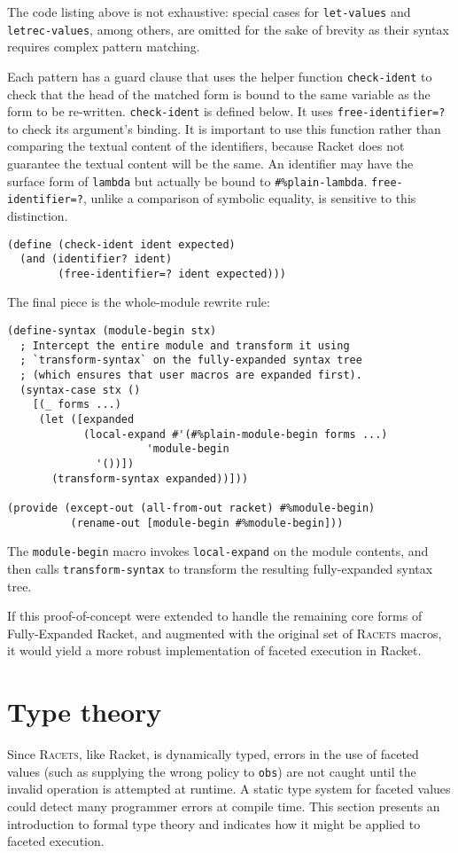 \documentclass{article}
\begin{document}
The code listing above is not exhaustive: special cases for \texttt{let-values} and \texttt{letrec-values}, among others, are omitted for the sake of brevity as their syntax requires complex pattern matching.

Each pattern has a guard clause that uses the helper function \texttt{check-ident} to check that the head of the matched form is bound to the same variable as the form to be re-written. \texttt{check-ident} is defined below. It uses \texttt{free-identifier=?} to check its argument's binding. It is important to use this function rather than comparing the textual content of the identifiers, because Racket does not guarantee the textual content will be the same. An identifier may have the surface form of \texttt{lambda} but actually be bound to \texttt{\#\%plain-lambda}. \texttt{free-identifier=?}, unlike a comparison of symbolic equality, is sensitive to this distinction.

\begin{lstlisting}
(define (check-ident ident expected)
  (and (identifier? ident)
        (free-identifier=? ident expected)))
\end{lstlisting}

The final piece is the whole-module rewrite rule:

\begin{lstlisting}
(define-syntax (module-begin stx)
  ; Intercept the entire module and transform it using
  ; `transform-syntax` on the fully-expanded syntax tree
  ; (which ensures that user macros are expanded first).
  (syntax-case stx ()
    [(_ forms ...)
     (let ([expanded
            (local-expand #'(#%plain-module-begin forms ...)
	                  'module-begin
			  '())])
       (transform-syntax expanded))]))

(provide (except-out (all-from-out racket) #%module-begin)
          (rename-out [module-begin #%module-begin]))
\end{lstlisting}

The \texttt{module-begin} macro invokes \texttt{local-expand} on the module contents, and then calls \texttt{transform-syntax} to transform the resulting fully-expanded syntax tree.

If this proof-of-concept were extended to handle the remaining core forms of Fully-Expanded Racket, and augmented with the original set of \textsc{Racets} macros, it would yield a more robust implementation of faceted execution in Racket.



\section{Type theory\label{sec:types}}
Since \textsc{Racets}, like Racket, is dynamically typed, errors in the use of faceted values (such as supplying the wrong policy to \texttt{obs}) are not caught until the invalid operation is attempted at runtime. A static type system for faceted values could detect many programmer errors at compile time. This section presents an introduction to formal type theory and indicates how it might be applied to faceted execution.
\end{document}
